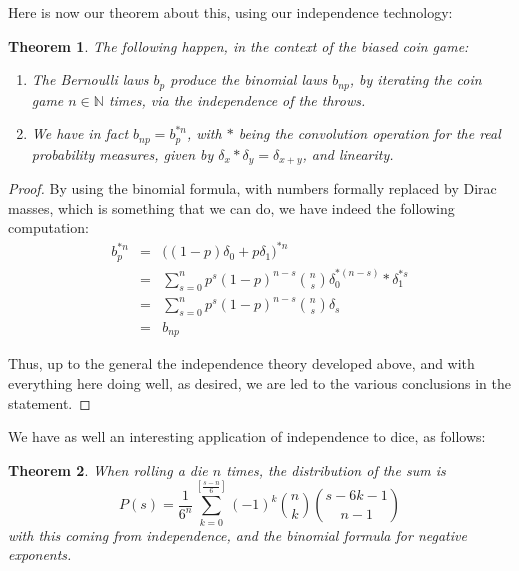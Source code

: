 \documentclass[12pt]{amsbook}
\newtheorem{theorem}{Theorem}[chapter]
\begin{document}
Here is now our theorem about this, using our independence technology:

\begin{theorem}
The following happen, in the context of the biased coin game:
\begin{enumerate}
\item The Bernoulli laws $b_p$ produce the binomial laws $b_{np}$, by iterating the coin game $n\in\mathbb N$ times, via the independence of the throws.

\item We have in fact $b_{np}=b_p^{*n}$, with $*$ being the convolution operation for the real probability measures, given by $\delta_x*\delta_y=\delta_{x+y}$, and linearity.
\end{enumerate}
\end{theorem}

\begin{proof}
By using the binomial formula, with numbers formally replaced by Dirac masses, which is something that we can do, we have indeed the following computation:
\begin{eqnarray*}
b_p^{*n}
&=&\big((1-p)\delta_0+p\delta_1\big)^{*n}\\
&=&\sum_{s=0}^np^s(1-p)^{n-s}\binom{n}{s}\delta_0^{*(n-s)}*\delta_1^{*s}\\
&=&\sum_{s=0}^np^s(1-p)^{n-s}\binom{n}{s}\delta_s\\
&=&b_{np}
\end{eqnarray*}

Thus, up to the general the independence theory developed above, and with everything here doing well, as desired, we are led to the various conclusions in the statement.
\end{proof}

We have as well an interesting application of independence to dice, as follows:

\begin{theorem}
When rolling a die $n$ times, the distribution of the sum is
$$P(s)=\frac{1}{6^n}\sum_{k=0}^{[\frac{s-n}{6}]}(-1)^k\binom{n}{k}\binom{s-6k-1}{n-1}$$
with this coming from independence, and the binomial formula for negative exponents.
\end{theorem}
\end{document}
